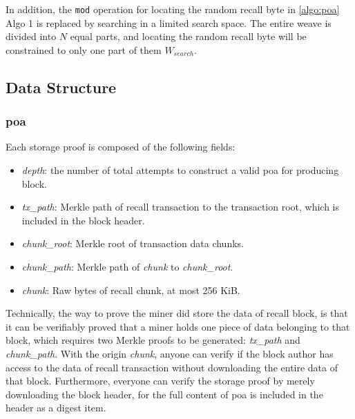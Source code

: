 \documentclass[]{article}
\begin{document}
In addition, the \texttt{mod} operation for locating the random recall byte in \ref{algo:poa}{ Algo 1} is replaced by searching in a limited search space. The entire weave is divided into $N$ equal parts, and locating the random recall byte will be constrained to only one part of them $W_{search}$.

\subsection{Data Structure}

\subsubsection{poa}\label{poa}

Each storage proof is composed of the following fields:

\begin{itemize}
    \item \textit{depth}: the number of total attempts to construct a valid poa for producing block.
    \item \textit{tx\_path}: Merkle path of recall transaction to the transaction root, which is included in the block header.
    \item \textit{chunk\_root}: Merkle root of transaction data chunks.
    \item \textit{chunk\_path}: Merkle path of \textit{chunk} to \textit{chunk\_root}.
    \item \textit{chunk}: Raw bytes of recall chunk, at most 256 KiB.
\end{itemize}

Technically, the way to prove the miner did store the data of recall block, is that it can be verifiably proved that a miner holds one piece of data belonging to that block, which requires two Merkle proofs to be generated: \textit{tx\_path} and \textit{chunk\_path}. With the origin \textit{chunk}, anyone can verify if the block author has access to the data of recall transaction without downloading the entire data of that block. Furthermore, everyone can verify the storage proof by merely downloading the block header, for the full content of poa is included in the header as a digest item.
\end{document}
